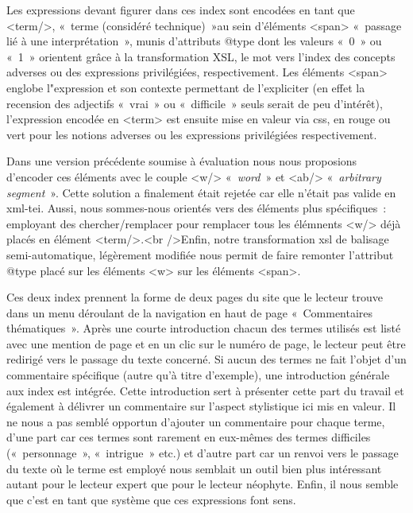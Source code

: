 \documentclass[12pt, a4paper]{article}
\begin{document}
 \label{encW} Les expressions devant figurer dans ces index sont encodées en tant que <term/>, «~terme (considéré technique)~»au sein d'éléments <span> «~passage lié à une interprétation~», munis d'attributs @type dont les valeurs «~0~» ou «~1~» orientent grâce à la transformation XSL, le mot vers l'index des concepts adverses ou des expressions privilégiées, respectivement. Les éléments <span> englobe l"expression et son contexte permettant de l'expliciter (en effet la recension des adjectifs «~vrai~» ou «~difficile~»  seuls serait de peu d'intérêt), l'expression encodée en <term> est ensuite mise en valeur via css, en rouge ou vert pour les notions adverses ou les expressions privilégiées respectivement.

Dans une version précédente soumise à évaluation nous nous proposions d'encoder ces éléments avec le couple <w/> «~\textit{word}~» et <ab/> «~\textit{arbitrary segment}~». Cette solution a finalement était rejetée car elle n'était pas valide en xml-tei. Aussi, nous sommes-nous orientés vers des éléments plus spécifiques~: employant des chercher/remplacer pour remplacer tous les élémnents <w/> déjà placés en élément <term/>.<br />Enfin, notre transformation xsl de balisage semi-automatique, légèrement modifiée nous permit de faire remonter l'attribut @type placé sur les éléments <w> sur les éléments <span>.


Ces deux index prennent la forme de deux pages du site que le lecteur trouve dans un menu déroulant de la navigation en haut de page «~Commentaires thématiques~». Après une courte introduction chacun des termes utilisés est listé avec une mention de page et en un clic sur le numéro de page, le lecteur peut être redirigé vers le passage du texte concerné. Si aucun des termes ne fait l'objet d'un commentaire spécifique (autre qu'à titre d'exemple), une introduction générale aux index est intégrée. Cette introduction sert à présenter cette part du travail et également à délivrer un commentaire sur l'aspect stylistique ici mis en valeur. Il ne nous a pas semblé opportun d'ajouter un commentaire pour chaque terme, d'une part car ces termes sont rarement en eux-mêmes des termes difficiles («~personnage~», «~intrigue~» etc.) et d'autre part car un renvoi vers le passage du texte où le terme est employé nous semblait un outil bien plus intéressant autant pour le lecteur expert que pour le lecteur néophyte. Enfin, il nous semble que c'est en tant que système que ces expressions font sens. 
\end{document}
